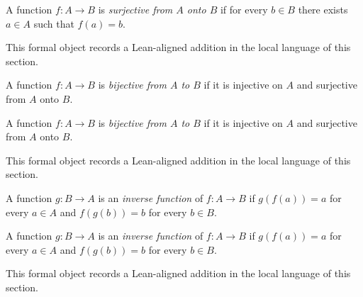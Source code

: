 \begin{remark*}
A function $f:A\to B$ is \emph{surjective from $A$ onto $B$} if for every $b\in B$ there exists $a\in A$ such that $f(a)=b$.
\end{remark*}

\begin{remark*}[Interpretation]
This formal object records a Lean-aligned addition in the local language of this section.
\end{remark*}

\begin{dependencies}
\NoLocalDependencies
\end{dependencies}
\begin{definition}
\label{def:is-bijective-on}
A function $f:A\to B$ is \emph{bijective from $A$ to $B$} if it is injective on $A$ and surjective from $A$ onto $B$.
\end{definition}

\begin{remark*}
A function $f:A\to B$ is \emph{bijective from $A$ to $B$} if it is injective on $A$ and surjective from $A$ onto $B$.
\end{remark*}

\begin{remark*}[Interpretation]
This formal object records a Lean-aligned addition in the local language of this section.
\end{remark*}

\begin{dependencies}
\NoLocalDependencies
\end{dependencies}
\begin{definition}
\label{def:is-inverse-function-of}
A function $g:B\to A$ is an \emph{inverse function} of $f:A\to B$ if $g(f(a))=a$ for every $a\in A$ and $f(g(b))=b$ for every $b\in B$.
\end{definition}

\begin{remark*}
A function $g:B\to A$ is an \emph{inverse function} of $f:A\to B$ if $g(f(a))=a$ for every $a\in A$ and $f(g(b))=b$ for every $b\in B$.
\end{remark*}

\begin{remark*}[Interpretation]
This formal object records a Lean-aligned addition in the local language of this section.
\end{remark*}

\begin{dependencies}
\NoLocalDependencies
\end{dependencies}
